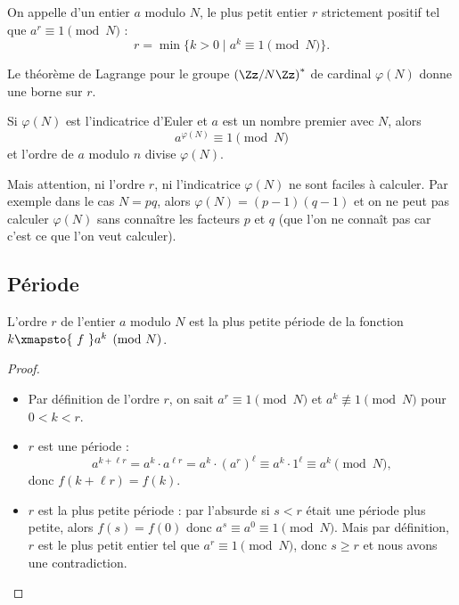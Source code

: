 \documentclass[11pt,class=report,crop=false]{standalone}
\begin{document}
\begin{definition}
On appelle  d'un entier $a$ modulo $N$, le plus petit entier $r$ strictement positif tel que $a^r \equiv 1 \pmod{N}$ :
$$r = \min \big\{ k>0 \mid a^k \equiv 1 \pmod{N} \big\}.$$ 
\end{definition}

Le théorème de Lagrange pour le groupe $\left(\Zz/N\Zz\right)^*$ de cardinal $\varphi(N)$ donne une borne sur $r$.
\begin{proposition}
Si $\varphi(N)$ est l'indicatrice d'Euler et $a$ est un nombre premier avec $N$, alors 
$$a^{\varphi(N)} \equiv 1 \pmod{N}$$ et l'ordre de $a$ modulo $n$ divise $\varphi(N)$.
\end{proposition}

Mais attention, ni l'ordre $r$, ni l'indicatrice $\varphi(N)$ ne sont faciles à calculer.
Par exemple dans le cas $N=pq$, alors $\varphi(N)=(p-1)(q-1)$ et on ne peut pas calculer $\varphi(N)$ sans connaître les facteurs $p$ et $q$ (que l'on ne connaît pas car c'est ce que l'on veut calculer).


\subsection{Période}

\begin{proposition}
L'ordre $r$ de l'entier $a$ modulo $N$ est la plus petite période de la fonction $k \xmapsto{\ f \ } a^k \pmod N$.
\end{proposition}


\begin{proof}~
\begin{itemize}
  \item Par définition de l'ordre $r$, on sait $a^r \equiv 1 \pmod N$ et $a^k \not\equiv 1 \pmod N$ pour $0<k<r$.
  \item $r$ est une période : 
  $$a^{k+\ell r} = a^k \cdot a^{\ell r} = a^k \cdot (a^r)^\ell \equiv a^k \cdot 1^\ell \equiv a^k \pmod N,$$
  donc $f(k+\ell r) = f(k)$. 
  \item $r$ est la plus petite période : par l'absurde si $s<r$ était une période plus petite, alors $f(s)=f(0)$ donc $a^s \equiv a^0 \equiv 1 \pmod N$.
  Mais par définition, $r$ est le plus petit entier tel que $a^r \equiv 1 \pmod N$, donc $s \ge r$ et nous avons une contradiction.
\end{itemize}
\end{proof}
\end{document}
